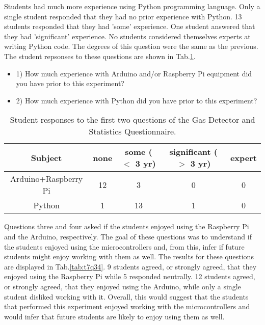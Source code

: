 Students had much more experience using Python programming language.
Only a single student responded that they had no prior experience with Python.
13 students responded that they had 'some' experience.
One student answered that they had 'significant' experience.
No students considered themselves experts at writing Python code.
The degrees of this question were the same as the previous.
The student repsonses to these questions are shown in Tab.\ref{tab:t7q12}.

\begin{table}[htpb]
  \scriptsize
  \begin{center}
    \caption{\scriptsize Student responses to the first two questions of the Gas Detector and Statistics Questionnaire.}
    \label{tab:t7q12}
    \begin{itemize}
    \item 1) How much experience with Arduino and/or Raspberry Pi equipment did you have prior to this experiment?
    \item 2) How much experience with Python did you have prior to this experiment?
    \end{itemize}
    

    \begin{tabular}{|c | c | c | c | c |}
      \hline
      Subject & none & some ($<$ 3 yr) & significant  ($>$ 3 yr) & expert\\
      \hline
      Arduino+Raspberry Pi & 12 & 3 & 0 & 0\\
      \hline
      Python & 1 & 13 & 1 & 0\\
      \hline
    \end{tabular}
  \end{center}%
\end{table}


Questions three and four asked if the students enjoyed using the Raspberry Pi and the Arduino, respectively.
The goal of these questions was to understand if the students enjoyed using the microcontrollers and, from this, infer if future students might enjoy working with them as well.
The results for these questions are displayed in Tab.\ref{tab:t7q34}.
9 students agreed, or strongly agreed, that they enjoyed using the Raspberry Pi while 5 responded neutrally.
12 students agreed, or strongly agreed, that they enjoyed using the Arduino, while only a single student disliked working with it.
Overall, this would suggest that the students that performed this experiment enjoyed working with the microcontrollers and would infer that future students are likely to enjoy using them as well.


